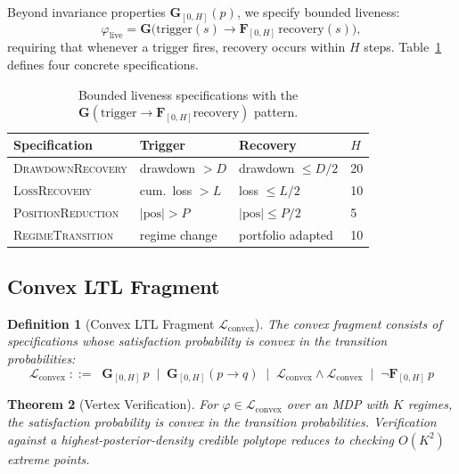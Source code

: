 \documentclass[11pt]{article}
\newtheorem{theorem}{Theorem}
\newtheorem{definition}[theorem]{Definition}
\newcommand{\cL}{\mathcal{L}}
\begin{document}
Beyond invariance properties $\mathbf{G}_{[0,H]}(p)$, we specify
bounded liveness:
\begin{equation}\label{eq:liveness}
  \varphi_{\mathrm{live}} = \mathbf{G}\bigl(\text{trigger}(s) \to
  \mathbf{F}_{[0,H]}\,\text{recovery}(s)\bigr),
\end{equation}
requiring that whenever a trigger fires, recovery occurs within $H$
steps.  Table~\ref{tab:liveness} defines four concrete specifications.

\begin{table}[t]
\centering
\caption{Bounded liveness specifications with the
$\mathbf{G}(\text{trigger} \to \mathbf{F}_{[0,H]}\text{recovery})$
pattern.}\label{tab:liveness}
\small
\begin{tabular}{@{}llll@{}}
\toprule
\textbf{Specification} & \textbf{Trigger} & \textbf{Recovery}
  & $H$ \\
\midrule
\textsc{DrawdownRecovery}  & drawdown $> D$
  & drawdown $\leq D/2$ & 20 \\
\textsc{LossRecovery}      & cum.\ loss $> L$
  & loss $\leq L/2$     & 10 \\
\textsc{PositionReduction} & $|\text{pos}| > P$
  & $|\text{pos}| \leq P/2$ & 5 \\
\textsc{RegimeTransition}  & regime change
  & portfolio adapted   & 10 \\
\bottomrule
\end{tabular}
\end{table}

\subsection{Convex LTL Fragment}\label{sec:convex}

\begin{definition}[Convex LTL Fragment $\cL_{\mathrm{convex}}$]
\label{def:convex}
The convex fragment consists of specifications whose satisfaction
probability is convex in the transition probabilities:
\begin{equation}
  \cL_{\mathrm{convex}} \;::=\;\;
    \mathbf{G}_{[0,H]}\, p
    \;\mid\; \mathbf{G}_{[0,H]} (p {\to} q)
    \;\mid\; \cL_{\mathrm{convex}} \wedge \cL_{\mathrm{convex}}
    \;\mid\; \neg\mathbf{F}_{[0,H]}\, p
\end{equation}
\end{definition}

\begin{theorem}[Vertex Verification]\label{thm:convex}
For $\varphi \in \cL_{\mathrm{convex}}$ over an MDP with $K$ regimes,
the satisfaction probability is convex in the transition probabilities.
Verification against a highest-posterior-density credible polytope
reduces to checking $O(K^2)$ extreme points.
\end{theorem}
\end{document}
